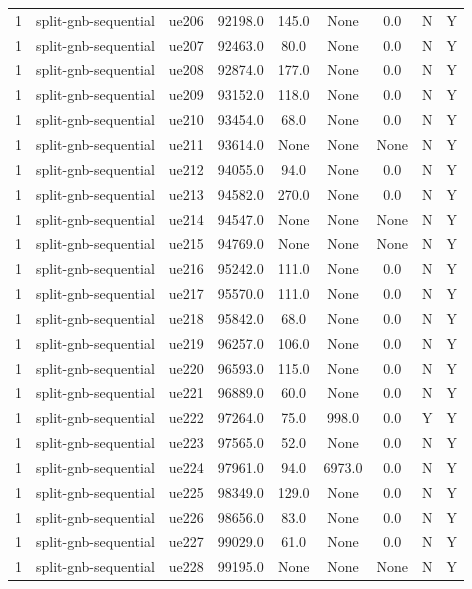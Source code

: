 \begin{table}[ht]
\begin{tabular}{|c|c|c|c|c|c|c|c|c|}
1 & split-gnb-sequential & ue206 & 92198.0 & 145.0 & None & 0.0 & N & Y \\
1 & split-gnb-sequential & ue207 & 92463.0 & 80.0 & None & 0.0 & N & Y \\
1 & split-gnb-sequential & ue208 & 92874.0 & 177.0 & None & 0.0 & N & Y \\
1 & split-gnb-sequential & ue209 & 93152.0 & 118.0 & None & 0.0 & N & Y \\
1 & split-gnb-sequential & ue210 & 93454.0 & 68.0 & None & 0.0 & N & Y \\
1 & split-gnb-sequential & ue211 & 93614.0 & None & None & None & N & Y \\
1 & split-gnb-sequential & ue212 & 94055.0 & 94.0 & None & 0.0 & N & Y \\
1 & split-gnb-sequential & ue213 & 94582.0 & 270.0 & None & 0.0 & N & Y \\
1 & split-gnb-sequential & ue214 & 94547.0 & None & None & None & N & Y \\
1 & split-gnb-sequential & ue215 & 94769.0 & None & None & None & N & Y \\
1 & split-gnb-sequential & ue216 & 95242.0 & 111.0 & None & 0.0 & N & Y \\
1 & split-gnb-sequential & ue217 & 95570.0 & 111.0 & None & 0.0 & N & Y \\
1 & split-gnb-sequential & ue218 & 95842.0 & 68.0 & None & 0.0 & N & Y \\
1 & split-gnb-sequential & ue219 & 96257.0 & 106.0 & None & 0.0 & N & Y \\
1 & split-gnb-sequential & ue220 & 96593.0 & 115.0 & None & 0.0 & N & Y \\
1 & split-gnb-sequential & ue221 & 96889.0 & 60.0 & None & 0.0 & N & Y \\
1 & split-gnb-sequential & ue222 & 97264.0 & 75.0 & 998.0 & 0.0 & Y & Y \\
1 & split-gnb-sequential & ue223 & 97565.0 & 52.0 & None & 0.0 & N & Y \\
1 & split-gnb-sequential & ue224 & 97961.0 & 94.0 & 6973.0 & 0.0 & N & Y \\
1 & split-gnb-sequential & ue225 & 98349.0 & 129.0 & None & 0.0 & N & Y \\
1 & split-gnb-sequential & ue226 & 98656.0 & 83.0 & None & 0.0 & N & Y \\
1 & split-gnb-sequential & ue227 & 99029.0 & 61.0 & None & 0.0 & N & Y \\
1 & split-gnb-sequential & ue228 & 99195.0 & None & None & None & N & Y \\

\end{tabular}
\end{table}
